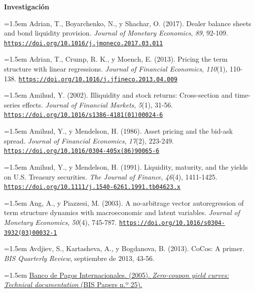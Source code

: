 \documentclass[10pt,a4paper]{article}
\begin{document}
\textbf{Investigación}

\noindent\hangindent=1.5em Adrian, T., Boyarchenko, N., y Shachar, O. (2017). Dealer balance sheets and bond liquidity provision. \textit{Journal of Monetary Economics}, \textit{89}, 92-109. \href{https://doi.org/10.1016/j.jmoneco.2017.03.011}{\nolinkurl{https://doi.org/10.1016/j.jmoneco.2017.03.011}}

\noindent\hangindent=1.5em Adrian, T., Crump, R. K., y Moench, E. (2013). Pricing the term structure with linear regressions. \textit{Journal of Financial Economics}, \textit{110}(1), 110-138. \href{https://doi.org/10.1016/j.jfineco.2013.04.009}{\nolinkurl{https://doi.org/10.1016/j.jfineco.2013.04.009}}

\noindent\hangindent=1.5em Amihud, Y. (2002). Illiquidity and stock returns: Cross-section and time-series effects. \textit{Journal of Financial Markets}, \textit{5}(1), 31-56. \href{https://doi.org/10.1016/s1386-4181(01)00024-6}{\nolinkurl{https://doi.org/10.1016/s1386-4181(01)00024-6}}

\noindent\hangindent=1.5em Amihud, Y., y Mendelson, H. (1986). Asset pricing and the bid-ask spread. \textit{Journal of Financial Economics}, \textit{17}(2), 223-249. \href{https://doi.org/10.1016/0304-405x(86)90065-6}{\nolinkurl{https://doi.org/10.1016/0304-405x(86)90065-6}}

\noindent\hangindent=1.5em Amihud, Y., y Mendelson, H. (1991). Liquidity, maturity, and the yields on U.S. Treasury securities. \textit{The Journal of Finance}, \textit{46}(4), 1411-1425. \href{https://doi.org/10.1111/j.1540-6261.1991.tb04623.x}{\nolinkurl{https://doi.org/10.1111/j.1540-6261.1991.tb04623.x}}

\noindent\hangindent=1.5em Ang, A., y Piazzesi, M. (2003). A no-arbitrage vector autoregression of term structure dynamics with macroeconomic and latent variables. \textit{Journal of Monetary Economics}, \textit{50}(4), 745-787. \href{https://doi.org/10.1016/s0304-3932(03)00032-1}{\nolinkurl{https://doi.org/10.1016/s0304-3932(03)00032-1}}

\noindent\hangindent=1.5em Avdjiev, S., Kartasheva, A., y Bogdanova, B. (2013). CoCos: A primer. \textit{BIS Quarterly Review}, septiembre de 2013, 43-56.

\noindent\hangindent=1.5em \href{https://www.bis.org/publ/bppdf/bispap25.htm}{Banco de Pagos Internacionales. (2005). \textit{Zero-coupon yield curves: Technical documentation} (BIS Papers n.º 25).}
\end{document}
